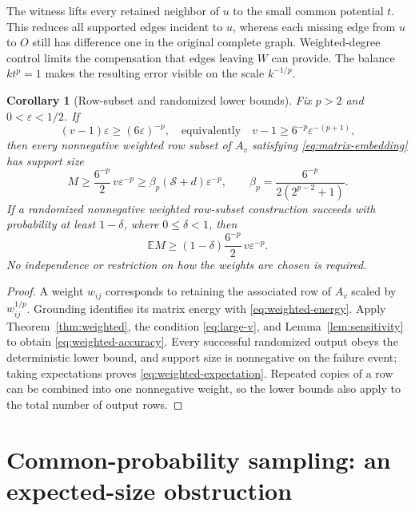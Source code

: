 \documentclass[11pt]{article}
\theoremstyle{spaced}
\newtheorem{corollary}[theorem]{Corollary}
\numberwithin{equation}{section}
\newcommand{\E}{\mathbb{E}}
\newcommand{\Sp}{\mathcal{S}}
\begin{document}
The witness lifts every retained neighbor of $u$ to the small common
potential $t$. This reduces all supported edges incident to $u$, whereas
each missing edge from $u$ to $O$ still has difference one in the original
complete graph. Weighted-degree control limits the compensation that
edges leaving $W$ can provide. The balance $kt^p=1$ makes the resulting
error visible on the scale $k^{-1/p}$.

\begin{corollary}[Row-subset and randomized lower bounds]
\label{cor:weighted-accuracy}
Fix $p>2$ and $0<\varepsilon<1/2$. If
\begin{equation}\label{eq:large-v}
 (v-1)\varepsilon\ge(6\varepsilon)^{-p},
 \quad\text{equivalently}\quad
 v-1\ge6^{-p}\varepsilon^{-(p+1)},
\end{equation}
then every nonnegative weighted row subset of $A_v$ satisfying
\eqref{eq:matrix-embedding} has support size
\begin{equation}\label{eq:weighted-accuracy}
 M\ge\frac{6^{-p}}2\,v\varepsilon^{-p}
 \ge\beta_p(\Sp+d)\varepsilon^{-p},
 \qquad
 \beta_p=\frac{6^{-p}}{2(2^{p-2}+1)}.
\end{equation}
If a randomized nonnegative weighted row-subset construction succeeds
with probability at least $1-\delta$, where $0\le\delta<1$, then
\begin{equation}\label{eq:weighted-expectation}
 \E M\ge(1-\delta)\frac{6^{-p}}2\,v\varepsilon^{-p}.
\end{equation}
No independence or restriction on how the weights are chosen is required.
\end{corollary}

\begin{proof}
A weight $w_{ij}$ corresponds to retaining the associated row of $A_v$
scaled by $w_{ij}^{1/p}$. Grounding identifies its matrix energy with
\eqref{eq:weighted-energy}. Apply Theorem~\ref{thm:weighted}, the
condition \eqref{eq:large-v}, and Lemma~\ref{lem:sensitivity} to obtain
\eqref{eq:weighted-accuracy}. Every successful randomized output obeys
the deterministic lower bound, and support size is nonnegative on the
failure event; taking expectations proves
\eqref{eq:weighted-expectation}.
Repeated copies of a row can be combined into one nonnegative weight,
so the lower bounds also apply to the total number of output rows.
\end{proof}

\section{Common-probability sampling: an expected-size obstruction}
\label{sec:common}
\end{document}
